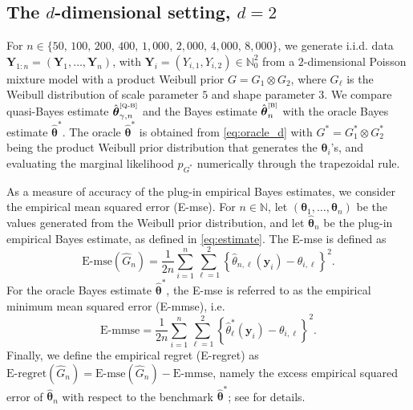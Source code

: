 \documentclass[twoside,12pt]{article}
\begin{document}
\subsection{The $d$-dimensional setting, $d=2$}

For $n\in\{50,\,100,\,200,\,400,\,1,000,\,2,000,\,4,000,\,8,000\}$, we generate i.i.d. data $\boldsymbol Y_{1:n}=(\boldsymbol Y_1,\ldots,\boldsymbol Y_n)$, with $\boldsymbol Y_i=(Y_{i,1},Y_{i,2})\in\mathbb N_0^2$ from a $2$-dimensional Poisson mixture model with a product Weibull prior $G=G_1\otimes G_2$, where $G_{\ell}$ is the Weibull distribution of scale parameter $5$ and shape parameter $3$. We compare quasi-Bayes estimate $\hat{\boldsymbol{\theta}}^{\text{\tiny{[Q-B]}}}_{\gamma,n}$ and the Bayes estimate $\hat{\boldsymbol{\theta}}^{\text{\tiny{[B]}}}_{n}$ with the oracle Bayes estimate $\hat{\boldsymbol{\theta}}^{\ast}$. The oracle $\hat{\boldsymbol{\theta}}^{\ast}$ is obtained from \eqref{eq:oracle_d} with $G^{\ast}=G_1^{\ast}\otimes G_2^{\ast}$ being the product Weibull prior distribution that generates the $\boldsymbol{\theta}_{i}$'s, and evaluating the marginal likelihood $p_{G^\ast}$ numerically through the trapezoidal rule.

As a measure of accuracy of the plug-in empirical Bayes estimates, we consider the empirical mean squared error (E-mse). For $n\in\mathbb{N}$, let $(\boldsymbol{\theta}_1,\ldots,\boldsymbol{\theta}_n)$ be the values generated from the Weibull prior distribution, and let $\hat{\boldsymbol{\theta}}_{n}$ be the plug-in empirical Bayes estimate, as defined in \eqref{eq:estimate}. The E-mse is defined as
\begin{displaymath}
\mathrm{E\text{-}mse}(\hat{G}_{n})=\frac{1}{2n}\sum_{i=1}^{n}\sum_{\ell=1}^{2}\left\{\hat\theta_{n,\ell}(\boldsymbol y_i)-\theta_{i,\ell}\right\}^{2}.
\end{displaymath}
For the oracle Bayes estimate $\hat{\boldsymbol{\theta}}^{\ast}$, the E-mse is referred to as the empirical minimum mean squared error (E-mmse), i.e.
\begin{displaymath}
\mathrm{E\text{-}mmse}=\frac{1}{2n}\sum_{i=1}^{n}\sum_{\ell=1}^{2}\left\{\hat{\theta}^{\ast}_{\ell}(\boldsymbol y_i)-\theta_{i,\ell}\right\}^{2}.
\end{displaymath}
Finally, we define the empirical regret (E-regret) as $\mathrm{E\text{-}regret}(\hat{G}_{n})=\mathrm{E\text{-}mse}(\hat{G}_{n})-\mathrm{E\text{-}mmse}$, namely the excess empirical squared error of $\hat{\boldsymbol{\theta}}_{n}$ with respect to the benchmark $\hat{\boldsymbol{\theta}}^{\ast}$; see \citet{Efr(14),Efr(19)} for details.
\end{document}
